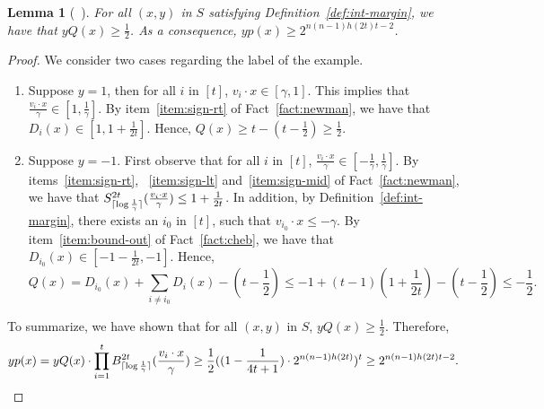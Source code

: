 \documentclass{article}
\DeclarePairedDelimiter\ceil{\lceil}{\rceil}
\newtheorem{lemma}[theorem]{Lemma}
\begin{document}
\begin{lemma}[~\cite{klivans2004learning}]
For all $(x,y)$ in $S$ satisfying Definition~\ref{def:int-margin}, we have that $y Q(x) \geq \frac 1 2$.
As a consequence, $y p(x) \geq 2^{n(n-1)h(2t)t - 2}$.
\end{lemma}
\begin{proof}
We consider two cases regarding the label of the example.
\begin{enumerate}
\item Suppose $y = 1$, then for all $i$ in $[t]$, $v_i \cdot x \in [\gamma, 1]$. This implies that $\frac{v_i \cdot x}{\gamma} \in [1, \frac 1 \gamma]$.
By item~\ref{item:sign-rt} of Fact~\ref{fact:newman}, we have that $D_i(x) \in [1, 1+ \frac 1 {2t}]$.
Hence, $Q(x) \geq t - (t - \frac 1 2) \geq \frac 1 2$.

\item Suppose $y = -1$. First observe that for all $i$ in $[t]$, $\frac{v_i \cdot x}{\gamma} \in [-\frac 1\gamma, \frac 1 \gamma]$. By items~\ref{item:sign-rt},
~\ref{item:sign-lt} and~\ref{item:sign-mid} of Fact~\ref{fact:newman}, we have that $S_{\ceil{\log \frac 1 \gamma}}^{2t}(\frac{v_i \cdot x}{\gamma}) \leq 1+ \frac 1 {2t}$.
In addition, by Definition~\ref{def:int-margin}, there exists an $i_0$ in $[t]$, such that $v_{i_0} \cdot x \leq -\gamma$.
By item~\ref{item:bound-out} of Fact~\ref{fact:cheb}, we have that
$D_{i_0}(x) \in [-1 - \frac 1 {2t}, -1]$.
Hence,
\[ Q(x) = D_{i_0}(x) + \sum_{i \neq i_0} D_i(x) - (t - \frac 1 2)
\leq -1 + (t-1)(1 + \frac 1 {2t}) - (t - \frac 1 2) \leq - \frac 1 2. \]
\end{enumerate}
To summarize, we have shown that for all $(x,y)$ in $S$, $y Q(x) \geq \frac 1 2$.
Therefore,
\[ y p(x) = y Q(x) \cdot \prod_{i=1}^t B_{\ceil{\log \frac 1 \gamma}}^{2t}(\frac{v_i \cdot x}\gamma) \geq \frac 1 2 ((1-\frac{1}{4t+1}) \cdot 2^{n(n-1)h(2t)})^t \geq 2^{n(n-1)h(2t)t - 2}. \]
\end{proof}
\end{document}

